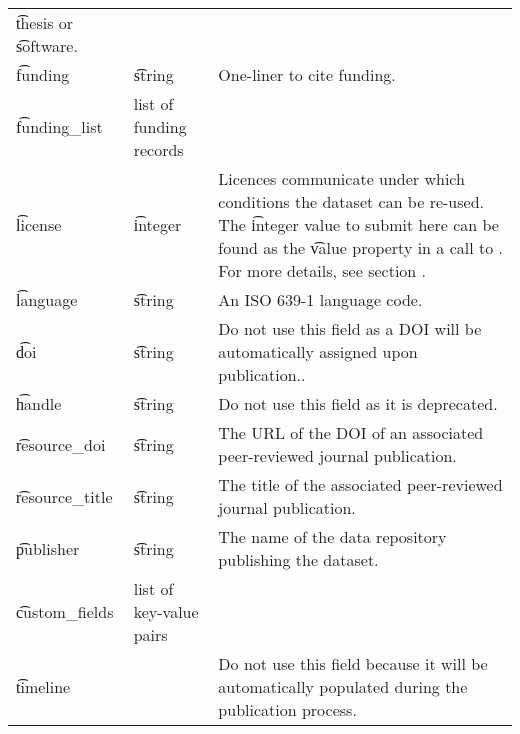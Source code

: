 \begin{tabularx}{\textwidth}{*{2}{!{\VRule[-1pt]}l}!{\VRule[-1pt]}X}
                                              \t{thesis} or \t{software}.\\
  \t{funding}        & \t{string}           & One-liner to cite funding.\\
  \t{funding\_list}  & list of funding records & \\
  \t{license}        & \t{integer}          & Licences communicate under which
                                              conditions the dataset can be
                                              re-used.  The \t{integer} value
                                              to submit here can be found as
                                              the \t{value} property in a call
                                              to . For more
                                              details, see section
                                              .\\
  \t{language}       & \t{string}           & An ISO 639-1 language code.\\
  \t{doi}            & \t{string}           & Do not use this field as a DOI
                                              will be automatically assigned
                                              upon publication..\\
  \t{handle}         & \t{string}           & Do not use this field as it is
                                              deprecated.\\
  \t{resource\_doi}  & \t{string}           & The URL of the DOI of an
                                              associated peer-reviewed
                                              journal publication.\\
  \t{resource\_title} & \t{string}          & The title of the associated
                                              peer-reviewed journal
                                              publication.\\
  \t{publisher}      & \t{string}           & The name of the data repository
                                              publishing the dataset.\\
  \t{custom\_fields} & list of key-value pairs & \\
  \t{timeline}       &                      & Do not use this field because it
                                              will be automatically populated
                                              during the publication process.
\end{tabularx}

